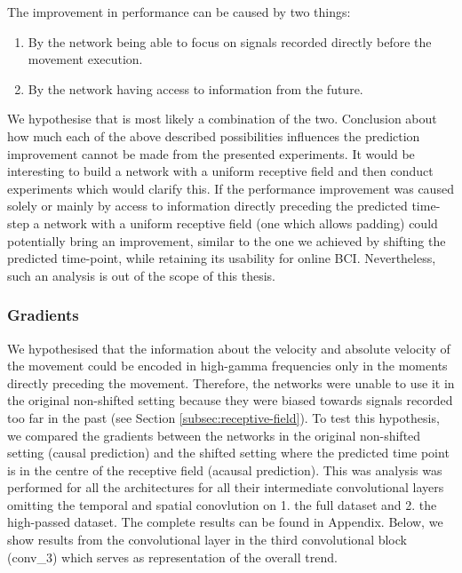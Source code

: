 The improvement in performance can be caused by two things:
\begin{enumerate}
    \item By the network being able to focus on signals recorded directly before the movement execution.
    \item By the network having access to information from the future.
\end{enumerate}

We hypothesise that is most likely a combination of the two.
Conclusion about how much each of the above described possibilities influences the prediction improvement cannot be made from the presented experiments.
It would be interesting to build a network with a uniform receptive field and then conduct experiments which would clarify this.
If the performance improvement was caused solely or mainly by access to information directly preceding the predicted time-step a network with a uniform receptive field (one which allows padding) could potentially bring an improvement, similar to the one we achieved by shifting the predicted time-point, while retaining its usability for online BCI.
Nevertheless, such an analysis is out of the scope of this thesis.

\subsubsection{Gradients}
We hypothesised that the information about the velocity and absolute velocity of the movement could be encoded in high-gamma frequencies only in the moments directly preceding the movement.
Therefore, the networks were unable to use it in the original non-shifted setting because they were biased towards signals recorded too far in the past (see Section \ref{subsec:receptive-field}).
To test this hypothesis, we compared the gradients between the networks in the original non-shifted setting (causal prediction) and the shifted setting where the predicted time point is in the centre of the receptive field (acausal prediction).
This was analysis was performed for all the architectures for all their intermediate convolutional layers omitting the temporal and spatial conovlution on 1. the full dataset and 2. the high-passed dataset.
The complete results can be found in Appendix.
Below, we show results from the convolutional layer in the third convolutional block (conv\_3) which serves as representation of the overall trend. 

